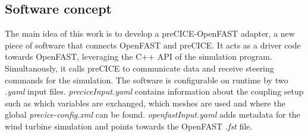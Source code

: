\subsection{Software concept}

The main idea of this work is to develop a preCICE-OpenFAST adapter, a new piece of software that connects OpenFAST and preCICE. It acts as a driver code towards OpenFAST, leveraging the C++ API of the simulation program. Simultanously, it calls preCICE to communicate data and receive steering commands for the simulation. The software is configurable on runtime by two \textit{.yaml} input files. \textit{preciceInput.yaml} contains information about the coupling setup such as which variables are exchanged, which meshes are used and where the global \textit{precice-config.xml} can be found. \textit{openfastInput.yaml} adds metadata for the wind turbine simulation and points towards the OpenFAST \textit{.fst} file.

